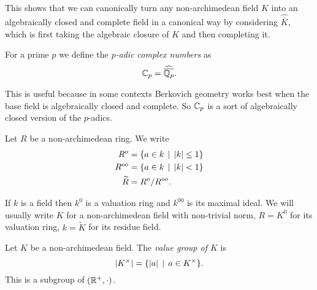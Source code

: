 This shows that we can canonically turn any non-archimedean field $K$ into an algebraically closed and complete field in a canonical way by considering $\widehat{\overline{K}}$, which is first taking the algebraic closure of $K$ and then completing it. 

\begin{definition}
	For a prime $p$ we define the \emph{p-adic complex numbers} as \[
	\mathbb{C}_p = \widehat{\overline{\mathbb{Q}_p}}
	.\] 
\end{definition}

This is useful because in some contexts Berkovich geometry works best when the base field is algebraically closed and complete. 
So $\mathbb{C}_p$ is a sort of algebraically closed version of the $p$-adics. 

\begin{definition}
	Let $R$ be a non-archimedean ring. We write 
	\begin{align*}
		R^{o} &= \{a \in k \st |k| \le 1\}  \\
		R^{oo} &=  \{a \in k \st |k| < 1\}  \\
		\widetilde R &= R^{o} / R^{oo}
	.\end{align*}
\end{definition}

If $k$ is a field then $k^{0}$ is a valuation ring and $ k^{00}$ is its maximal ideal. 
We will usually write $K$ for a non-archimedean field with non-trivial norm, $R = K^{0}$ for its valuation ring, $k = \widetilde K$ for its residue field. 

\begin{definition}
	Let $K$ be a non-archimedean field. 
	The \emph{value group of $K$} is \[
	|K^{\times }| = \{|a| \st  a \in K^{\times }  \} 
	.\] 
	This is a subgroup of $(\mathbb{R}^{ +}, \cdot )$. 
\end{definition}
